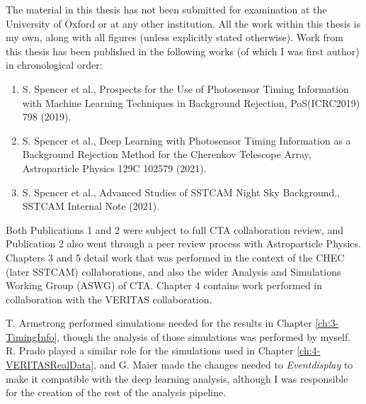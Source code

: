 The material in this thesis has not been submitted for examination at the University of Oxford or at any other institution. All the work within this thesis is my own, along with all figures (unless explicitly stated otherwise). Work from this thesis has been published in the following works (of which I was first author) in chronological order:

\begin{centering}
\begin{enumerate}
    \item S. Spencer et al., Prospects for the Use of Photosensor Timing Information with Machine Learning Techniques in Background Rejection, PoS(ICRC2019) 798 (2019).
    \item S. Spencer et al., Deep Learning with Photosensor Timing Information as a Background Rejection Method for the Cherenkov Telescope Array, Astroparticle Physics 129C 102579 (2021).
    \item S. Spencer et al., Advanced Studies of SSTCAM Night Sky Background., SSTCAM Internal Note (2021). 
\end{enumerate}
\end{centering}
Both Publications 1 and 2 were subject to full CTA collaboration review, and Publication 2 also went through a peer review process with Astroparticle Physics. Chapters 3 and 5 detail work that was performed in the context of the CHEC (later SSTCAM) collaborations, and also the wider Analysis and Simulations Working Group (ASWG) of CTA. Chapter 4 contains work performed in collaboration with the VERITAS collaboration.

T. Armstrong performed simulations needed for the results in Chapter \ref{ch:3-TimingInfo}, though the analysis of those simulations was performed by myself. R. Prado played a similar role for the simulations used in Chapter \ref{ch:4-VERITASRealData}, and G. Maier made the changes needed to \textit{Eventdisplay} to make it compatible with the deep learning analysis, although I was responsible for the creation of the rest of the analysis pipeline.